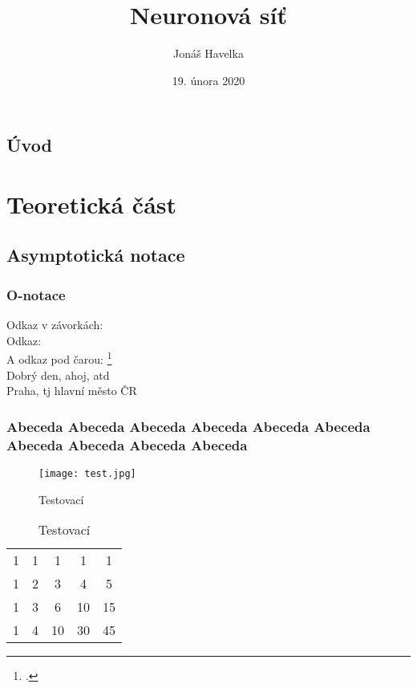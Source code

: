 \documentclass[12pt]{report}			%
\author{Jonáš Havelka}
\title{Neuronová síť}
\date{19. února 2020}
\begin{document}
\mytitlepage						%


\abstrakt{
	\lipsum[1]						%
}{
	\lipsum[1]						%
}

\podekovani{
	\lipsum[2]						%
}

\tableofcontents
\newpage			%




\chapter*{Úvod}

\lipsum[1]


\part{Teoretická část}

\chapter{Asymptotická notace}

\section{O-notace}
Odkaz v závorkách: \parencite[see][page 900]{einstein}\\
Odkaz: \cite{knuthwebsite}\\
A odkaz pod čarou: \footcite[see][s. 42]{latexcompanion}\\
Dobrý den, ahoj, \gls{atd}\\
Praha, \gls{tj} hlavní město ČR

\section{Abeceda Abeceda Abeceda Abeceda Abeceda Abeceda Abeceda Abeceda Abeceda Abeceda }
\begin{figure}
	\texttt{[image: test.jpg]}
	\caption{Testovací}
	\label{fig:test}
\end{figure}
\begin{table}
	\caption{Testovací}
	\label{tab:test2}
	\begin{tabular}{ccccc}
		1 & 1 & 1  & 1  & 1  \\
		1 & 2 & 3  & 4  & 5  \\
		1 & 3 & 6  & 10 & 15 \\
		1 & 4 & 10 & 30 & 45
	\end{tabular}
\end{table}
\end{document}
